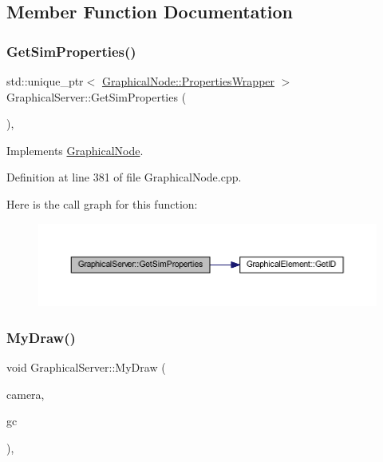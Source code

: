 \subsection{Member Function Documentation}
\mbox{\label{class_graphical_server_a857655d34a7e3662100e7b86526e2855}} 
\subsubsection{\texorpdfstring{Get\+Sim\+Properties()}{GetSimProperties()}}
{\footnotesize\ttfamily std\+::unique\+\_\+ptr$<$ \hyperlink{class_graphical_node_1_1_properties_wrapper}{Graphical\+Node\+::\+Properties\+Wrapper} $>$ Graphical\+Server\+::\+Get\+Sim\+Properties (\begin{DoxyParamCaption}{ }\end{DoxyParamCaption})\hspace{0.3cm}{\ttfamily [override]}, {\ttfamily [virtual]}}



Implements \hyperlink{class_graphical_node_a2ad6386709ceabfbf97daabf4c6cd64a}{Graphical\+Node}.



Definition at line 381 of file Graphical\+Node.\+cpp.

Here is the call graph for this function\+:
\nopagebreak
\begin{figure}[H]
\begin{center}
\leavevmode
\includegraphics[width=350pt]{class_graphical_server_a857655d34a7e3662100e7b86526e2855_cgraph}
\end{center}
\end{figure}
\mbox{\label{class_graphical_server_ad144b6cfdf945981fd0db425dfc41e5b}} 
\subsubsection{\texorpdfstring{My\+Draw()}{MyDraw()}}
{\footnotesize\ttfamily void Graphical\+Server\+::\+My\+Draw (\begin{DoxyParamCaption}\item[{const wx\+Affine\+Matrix2D \&}]{camera,  }\item[{wx\+Graphics\+Context $\ast$}]{gc }\end{DoxyParamCaption})\hspace{0.3cm}{\ttfamily [override]}, {\ttfamily [virtual]}}



